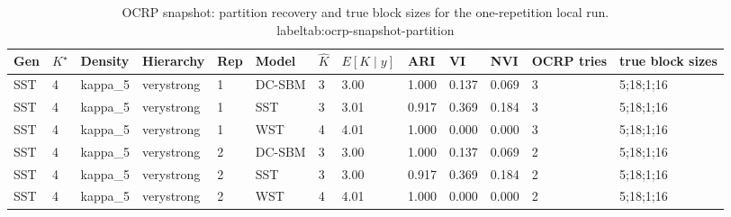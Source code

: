 \begin{table}[!h]
\centering
\caption{OCRP snapshot: partition recovery and true block sizes for the one-repetition local run.\\label{tab:ocrp-snapshot-partition}}
\centering
\begin{tabular}[t]{lllllllllllll}
\toprule
Gen & $K^\star$ & Density & Hierarchy & Rep & Model & $\hat K$ & $E[K\mid y]$ & ARI & VI & NVI & OCRP tries & true block sizes\\
\midrule
SST & 4 & kappa_5 & verystrong & 1 & DC-SBM & 3 & 3.00 & 1.000 & 0.137 & 0.069 & 3 & 5;18;1;16\\
SST & 4 & kappa_5 & verystrong & 1 & SST & 3 & 3.01 & 0.917 & 0.369 & 0.184 & 3 & 5;18;1;16\\
SST & 4 & kappa_5 & verystrong & 1 & WST & 4 & 4.01 & 1.000 & 0.000 & 0.000 & 3 & 5;18;1;16\\
SST & 4 & kappa_5 & verystrong & 2 & DC-SBM & 3 & 3.00 & 1.000 & 0.137 & 0.069 & 2 & 5;18;1;16\\
SST & 4 & kappa_5 & verystrong & 2 & SST & 3 & 3.00 & 0.917 & 0.369 & 0.184 & 2 & 5;18;1;16\\
SST & 4 & kappa_5 & verystrong & 2 & WST & 4 & 4.01 & 1.000 & 0.000 & 0.000 & 2 & 5;18;1;16\\
\bottomrule
\end{tabular}
\end{table}

